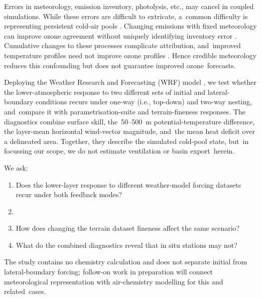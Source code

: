 \documentclass[air,article,accept,moreauthors]{Definitions/mdpi}
\begin{document}
Errors in meteorology, emission inventory, photolysis, etc., may cancel in coupled simulations.
While these errors are difficult to extricate, a~common difficulty is representing persistent cold-air pools \citep{Tran2018FDDA,Neemann2015-ws}.
Changing emissions with fixed meteorology can improve ozone agreement without uniquely identifying inventory error \citep{Ahmadov2015Complete}.
Cumulative changes to these processes complicate attribution, and~improved temperature profiles need not improve ozone profiles \citep{Matichuk2017-bq}.
Hence credible meteorology reduces this confounding but does not guarantee improved ozone~forecasts.

Deploying the Weather Research and Forecasting (WRF) model \citep{Skamarock2019}, we test whether the lower-atmospheric response to two different sets of initial and lateral-boundary conditions recurs under one-way (i.e., top-down) and two-way nesting, and~compare it with parametrisation-suite and terrain-fineness responses.
The diagnostics combine surface skill, the~50--500~m potential-temperature difference, the layer-mean horizontal wind-vector magnitude, and~the mean heat deficit over a delineated area.
Together, they describe the simulated cold-pool state, but~in focussing our scope, we do not estimate ventilation or basin export~herein.

We ask:

\begin{enumerate}[leftmargin=*,labelsep=4.9mm]
  \item Does the lower-layer response to different weather-model forcing datasets recur under both feedback modes?
  \item {}
  \item How does changing the terrain dataset fineness affect the same scenario?
  \item What do the combined diagnostics reveal that in situ stations may not?
\end{enumerate}

The study contains no chemistry calculation and does not separate initial from lateral-boundary forcing; follow-on work in preparation will connect meteorological representation with air-chemistry modelling for this and related~cases.
\end{document}
